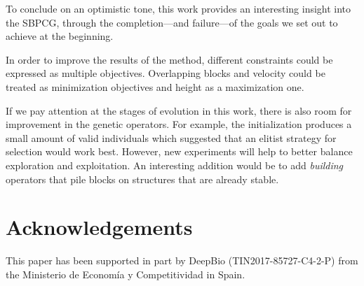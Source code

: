 \documentclass[a4paper,twoside]{article}
\begin{document}

To conclude on an optimistic tone, this work provides an interesting insight 
into the SBPCG, through the completion---and failure---of the goals we
set out to achieve at the beginning.

In order to improve the results of the method, different constraints could be 
expressed as multiple objectives. Overlapping blocks and velocity could 
be treated as minimization objectives and height as a maximization one. %

If we pay attention at the stages of evolution in this work, there is also 
room for improvement in the genetic operators. For example, the initialization 
produces a small amount of valid individuals which suggested that an elitist 
strategy for selection would work best. However, new experiments will help to 
better balance exploration and exploitation. An interesting addition
would be to add {\em building} operators that pile blocks on
structures that are already stable. %

\section{Acknowledgements}
 This paper has been supported in part by DeepBio
 (TIN2017-85727-C4-2-P) from the Ministerio de Economía y Competitividad
 in Spain.


{\small
}
\end{document}
